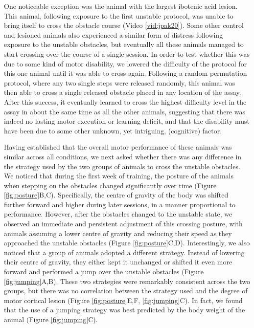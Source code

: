 One noticeable exception was the animal with the largest ibotenic acid lesion. This animal, following exposure to the first unstable protocol, was unable to bring itself to cross the obstacle course (Video \ref{vid:jpak20}). Some other control and lesioned animals also experienced a similar form of distress following exposure to the unstable obstacles, but eventually all these animals managed to start crossing over the course of a single session. In order to test whether this was due to some kind of motor disability, we lowered the difficulty of the protocol for this one animal until it was able to cross again. Following a random permutation protocol, where any two single steps were released randomly, this animal was then able to cross a single released obstacle placed in any location of the assay. After this success, it eventually learned to cross the highest difficulty level in the assay in about the same time as all the other animals, suggesting that there was indeed no lasting motor execution or learning deficit, and that the disability must have been due to some other unknown, yet intriguing, (cognitive) factor.

Having established that the overall motor performance of these animals was similar across all conditions, we next asked whether there was any difference in the strategy used by the two groups of animals to cross the unstable obstacles. We noticed that during the first week of training, the posture of the animals when stepping on the obstacles changed significantly over time (Figure \ref{fig:posture}B,C). Specifically, the centre of gravity of the body was shifted further forward and higher during later sessions, in a manner proportional to performance. However, after the obstacles changed to the unstable state, we observed an immediate and persistent adjustment of this crossing posture, with animals assuming a lower centre of gravity and reducing their speed as they approached the unstable obstacles (Figure \ref{fig:posture}C,D). Interestingly, we also noticed that a group of animals adopted a different strategy. Instead of lowering their centre of gravity, they either kept it unchanged or shifted it even more forward and performed a jump over the unstable obstacles (Figure \ref{fig:jumping}A,B). These two strategies were remarkably consistent across the two groups, but there was no correlation between the strategy used and the degree of motor cortical lesion (Figure \ref{fig:posture}E,F, \ref{fig:jumping}C). In fact, we found that the use of a jumping strategy was best predicted by the body weight of the animal (Figure \ref{fig:jumping}C).

